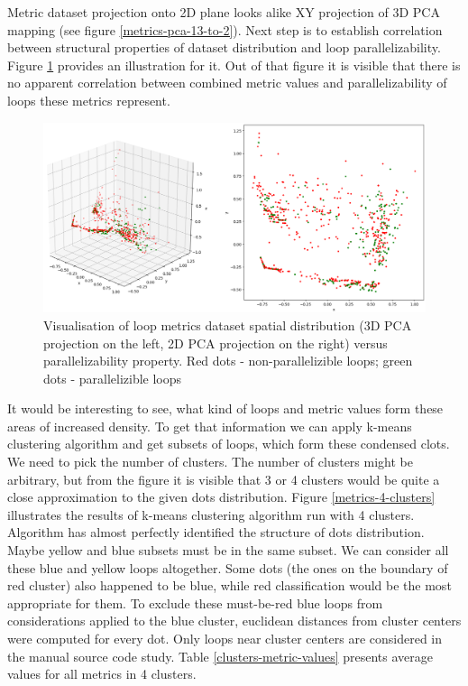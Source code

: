 \null\qquad Metric dataset projection onto 2D plane looks alike XY projection of 3D PCA mapping (see figure \ref{metrics-pca-13-to-2}). \newline
\null\qquad Next step is to establish correlation between structural properties of dataset distribution and loop parallelizability. Figure \ref{metrics-pca-parallelizability} provides an illustration for it. Out of that figure it is visible that there is no apparent correlation between combined metric values and parallelizability of loops these metrics represent. 
\begin{figure}[htb]
\centering
\includegraphics[width=\linewidth]{figs/metrics-pca-parallelizability.png}
\caption{Visualisation of loop metrics dataset spatial distribution (3D PCA projection on the left, 2D PCA projection on the right) versus parallelizability property. Red dots - non-parallelizible loops; green dots - parallelizible loops}
\label{metrics-pca-parallelizability}
\end{figure} \newline
\null \qquad It would be interesting to see, what kind of loops and metric values form these areas of increased density. To get that information we can apply k-means clustering algorithm and get subsets of loops, which form these condensed clots. We need to pick the number of clusters. The number of clusters might be arbitrary, but from the figure it is visible that 3 or 4 clusters would be quite a close approximation to the given dots distribution. Figure \ref{metrics-4-clusters} illustrates the results of k-means clustering algorithm run with 4 clusters. Algorithm has almost perfectly identified the structure of dots distribution. Maybe yellow and blue subsets must be in the same subset. We can consider all these blue and yellow loops altogether. Some dots (the ones on the boundary of red cluster) also happened to be blue, while red classification would be the most appropriate for them. To exclude these must-be-red blue loops from considerations applied to the blue cluster, euclidean distances from cluster centers were computed for every dot. Only loops near cluster centers are considered in the manual source code study. Table \ref{clusters-metric-values} presents average values for all metrics in 4 clusters. \newline
\null\qquad 

